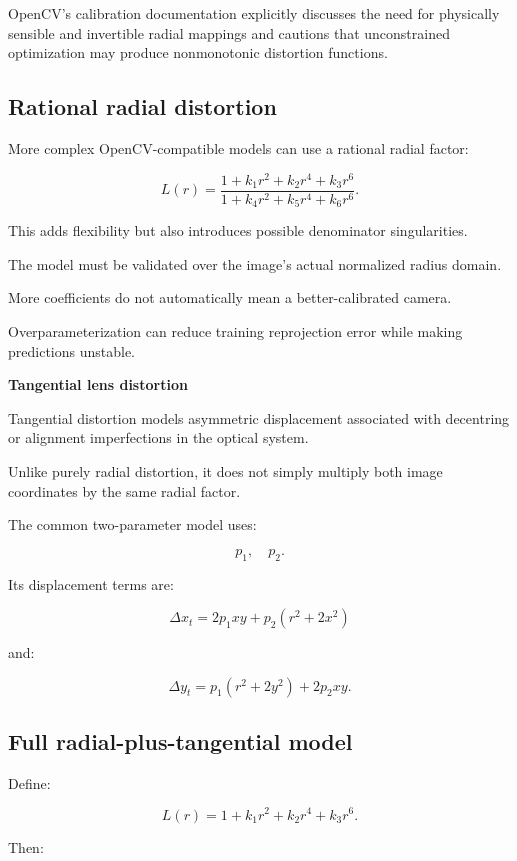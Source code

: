 OpenCV's calibration documentation explicitly discusses the need for physically sensible and invertible radial mappings and cautions that unconstrained optimization may produce nonmonotonic distortion functions. 

\subsection{Rational radial distortion}\label{02-foundations-ii-ch035-rational-radial-distortion}

More complex OpenCV-compatible models can use a rational radial factor:

\[
 \boxed{ L(r)= \frac{ 1+k_1r^2+k_2r^4+k_3r^6 }{ 1+k_4r^2+k_5r^4+k_6r^6 } }.
\]

This adds flexibility but also introduces possible denominator singularities.

The model must be validated over the image's actual normalized radius domain.

More coefficients do not automatically mean a better-calibrated camera.

Overparameterization can reduce training reprojection error while making predictions unstable.

\textbf{Tangential lens distortion}

Tangential distortion models asymmetric displacement associated with decentring or alignment imperfections in the optical system.

Unlike purely radial distortion, it does not simply multiply both image coordinates by the same radial factor.

The common two-parameter model uses:

\[
 p_1,\quad p_2.
\]

Its displacement terms are:

\[
 \boxed{ \Delta x_t= 2p_1xy+p_2(r^2+2x^2) }
\]

and:

\[
 \boxed{ \Delta y_t= p_1(r^2+2y^2)+2p_2xy }.
\]

\subsection{Full radial-plus-tangential model}\label{02-foundations-ii-ch035-full-radial-plus-tangential-model}

Define:

\[
 L(r)=1+k_1r^2+k_2r^4+k_3r^6.
\]

Then:

